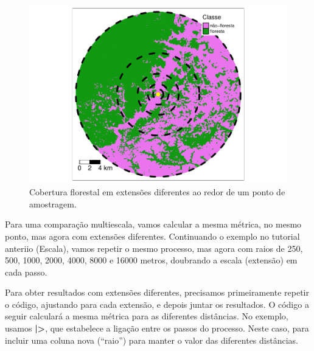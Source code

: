 \documentclass[
]{article}
\begin{document}
\begin{figure}
\centering
\includegraphics{epr_files/figure-latex/unnamed-chunk-34-1.pdf}
\caption{\label{fig:unnamed-chunk-34}Cobertura florestal em extensões diferentes ao redor de um ponto de amostragem.}
\end{figure}

Para uma comparação multiescala, vamos calcular a mesma métrica, no mesmo ponto, mas agora com extensões diferentes. Continuando o exemplo no tutorial anteriio (Escala), vamos repetir o mesmo processo, mas agora com raios de 250, 500, 1000, 2000, 4000, 8000 e 16000 metros, doubrando a escala (extensão) em cada passo.

\newpage

Para obter resultados com extensões diferentes, precisamos primeiramente repetir o código, ajustando para cada extensão, e depois juntar os resultados.
O código a seguir calculará a mesma métrica para as diferentes distâncias.
No exemplo, usamos \textbf{|>}, que estabelece a ligação entre os passos do processo. Neste caso, para incluir uma coluna nova (``raio'') para manter o valor das diferentes distâncias.
\end{document}
